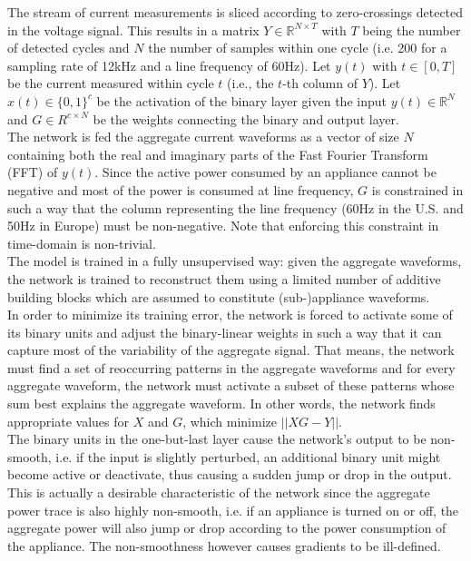 The stream of current measurements is sliced according to zero-crossings detected in the voltage signal. This results in a matrix $Y \in \mathbb{R}^{N \times T}$ with $T$ being the number of detected cycles and $N$ the number of samples within one cycle (i.e. 200 for a sampling rate of 12kHz and a line frequency of 60Hz). Let $y(t)$ with $t \in [0,T]$ be the current measured within cycle $t$ (i.e., the $t$-th column of $Y$). Let $x(t) \in \{0,1\}^c$ be the activation of the binary layer given the input $y(t) \in \mathbb{R}^{N}$ and $G \in R^{c \times N}$ be the weights connecting the binary and output layer. \\
The network is fed the aggregate current waveforms as a vector of size $N$ containing both the real and imaginary parts of the Fast Fourier Transform (FFT) of $y(t)$. Since the active power consumed by an appliance cannot be negative and most of the power is consumed at line frequency, $G$ is constrained in such a way that the column representing the line frequency (60Hz in the U.S. and 50Hz in Europe) must be non-negative. Note that enforcing this constraint in time-domain is non-trivial.\\
The model is trained in a fully unsupervised way: given the aggregate waveforms, the network is trained to reconstruct them using a limited number of additive building blocks which are assumed to constitute (sub-)appliance waveforms.\\
In order to minimize its training error, the network is forced to activate some of its binary units and adjust the binary-linear weights in such a way that it can capture most of the variability of the aggregate signal. That means, the network must find a set of reoccurring patterns in the aggregate waveforms and for every aggregate waveform, the network must activate a subset of these patterns whose sum best explains the aggregate waveform. In other words, the network finds appropriate values for $X$ and $G$, which minimize $||XG - Y||$.\\
The binary units in the one-but-last layer cause the network's output to be non-smooth, i.e. if the input is slightly perturbed, an additional binary unit might become active or deactivate, thus causing a sudden jump or drop in the output. This is actually a desirable characteristic of the network since the aggregate power trace is also highly non-smooth, i.e. if an appliance is turned on or off, the aggregate power will also jump or drop according to the power consumption of the appliance. The non-smoothness however causes gradients to be ill-defined. \\
